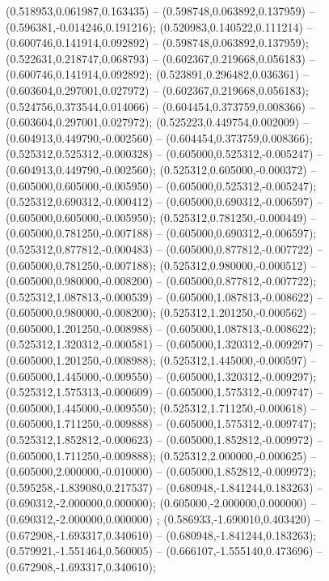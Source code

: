  (0.518953,0.061987,0.163435) -- (0.598748,0.063892,0.137959) -- (0.596381,-0.014246,0.191216);
 (0.520983,0.140522,0.111214) -- (0.600746,0.141914,0.092892) -- (0.598748,0.063892,0.137959);
 (0.522631,0.218747,0.068793) -- (0.602367,0.219668,0.056183) -- (0.600746,0.141914,0.092892);
 (0.523891,0.296482,0.036361) -- (0.603604,0.297001,0.027972) -- (0.602367,0.219668,0.056183);
 (0.524756,0.373544,0.014066) -- (0.604454,0.373759,0.008366) -- (0.603604,0.297001,0.027972);
 (0.525223,0.449754,0.002009) -- (0.604913,0.449790,-0.002560) -- (0.604454,0.373759,0.008366);
 (0.525312,0.525312,-0.000328) -- (0.605000,0.525312,-0.005247) -- (0.604913,0.449790,-0.002560);
 (0.525312,0.605000,-0.000372) -- (0.605000,0.605000,-0.005950) -- (0.605000,0.525312,-0.005247);
 (0.525312,0.690312,-0.000412) -- (0.605000,0.690312,-0.006597) -- (0.605000,0.605000,-0.005950);
 (0.525312,0.781250,-0.000449) -- (0.605000,0.781250,-0.007188) -- (0.605000,0.690312,-0.006597);
 (0.525312,0.877812,-0.000483) -- (0.605000,0.877812,-0.007722) -- (0.605000,0.781250,-0.007188);
 (0.525312,0.980000,-0.000512) -- (0.605000,0.980000,-0.008200) -- (0.605000,0.877812,-0.007722);
 (0.525312,1.087813,-0.000539) -- (0.605000,1.087813,-0.008622) -- (0.605000,0.980000,-0.008200);
 (0.525312,1.201250,-0.000562) -- (0.605000,1.201250,-0.008988) -- (0.605000,1.087813,-0.008622);
 (0.525312,1.320312,-0.000581) -- (0.605000,1.320312,-0.009297) -- (0.605000,1.201250,-0.008988);
 (0.525312,1.445000,-0.000597) -- (0.605000,1.445000,-0.009550) -- (0.605000,1.320312,-0.009297);
 (0.525312,1.575313,-0.000609) -- (0.605000,1.575312,-0.009747) -- (0.605000,1.445000,-0.009550);
 (0.525312,1.711250,-0.000618) -- (0.605000,1.711250,-0.009888) -- (0.605000,1.575312,-0.009747);
 (0.525312,1.852812,-0.000623) -- (0.605000,1.852812,-0.009972) -- (0.605000,1.711250,-0.009888);
 (0.525312,2.000000,-0.000625) -- (0.605000,2.000000,-0.010000) -- (0.605000,1.852812,-0.009972);
 (0.595258,-1.839080,0.217537) -- (0.680948,-1.841244,0.183263) -- (0.690312,-2.000000,0.000000);
 (0.605000,-2.000000,0.000000) -- (0.690312,-2.000000,0.000000) ;
 (0.586933,-1.690010,0.403420) -- (0.672908,-1.693317,0.340610) -- (0.680948,-1.841244,0.183263);
 (0.579921,-1.551464,0.560005) -- (0.666107,-1.555140,0.473696) -- (0.672908,-1.693317,0.340610);
